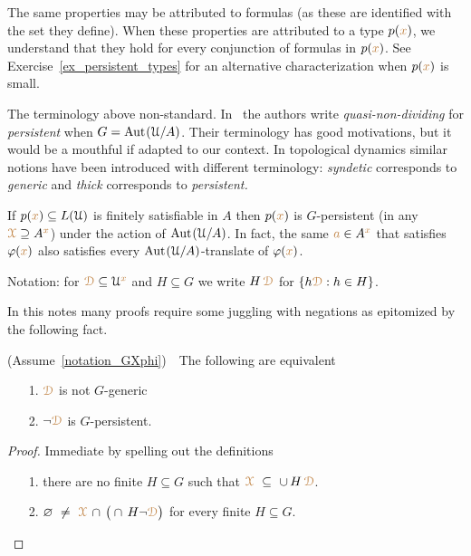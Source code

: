 The same properties may be attributed to formulas (as these are identified with the set they define).
When these properties are attributed to a type $p({\color{brown} x})$, we understand that they hold for every conjunction of formulas in $p({\color{brown} x})$.
See Exercise~\ref{ex_persistent_types} for an alternative characterization when $p({\color{brown} x})$ is small.

\noindent\llap{\textcolor{red}{\Large\warning}\kern1.5ex}\ignorespaces
The terminology above non-standard.
In~\cite{CK} the authors write \textit{quasi-non-dividing\/} for \textit{persistent\/} when $G={\rm Aut\kern.15ex}(\EuScript U/A)$.
Their terminology has good motivations, but it would be a mouthful if adapted to our context.
In topological dynamics similar notions have been introduced with different terminology: \textit{syndetic\/} corresponds to \textit{generic\/} and \textit{thick\/} corresponds to \textit{persistent.}

\begin{example}
  If $p({\color{brown} x})\subseteq L(\EuScript U)$ is finitely satisfiable in $A$ then $p({\color{brown} x})$ is $G$-persistent (in any ${\color{brown}\EuScript X}\supseteq A^{\color{brown} x}$) under the action of ${\rm Aut\kern.15ex}(\EuScript U/A)$.
  In fact, the same ${\color{brown} a}\in A^{\color{brown} x}$ that satisfies $\varphi({\color{brown} x})$ also satisfies every ${\rm Aut\kern.15ex}(\EuScript U/A)$-translate of $\varphi({\color{brown} x})$.
\end{example}

Notation: for ${\color{brown}\EuScript D}\subseteq\EuScript U^{\color{brown} x}$ and $H\subseteq G$ we write $H\,{\color{brown}\EuScript D}$ for $\{h{\color{brown}\EuScript D}: h\in H\}$.

In this notes many proofs require some juggling with negations as epitomized by the following fact.

\begin{fact}\label{fact_fip}
  (Assume~\ref{notation_GXphi})\ \  
  The following are equivalent
  \begin{itemize}
    \item[1.] ${\color{brown}\EuScript D}$ is not $G$-generic
    \item[2.] $\neg{\color{brown}\EuScript D}$ is $G$-persistent.
  \end{itemize}
\end{fact}

\begin{proof}
  Immediate by spelling out the definitions
  \begin{itemize}
    \item[1.] there are no finite $H\subseteq G$ such that ${\color{brown}\EuScript X}\ \subseteq\ \cup\, H\,{\color{brown}\EuScript D}$.
    \item[2.]  $\0\ \neq\ \mrX\,\cap\,\big(\cap\, H\neg{\mr\D}\big)$ for every finite $H\subseteq G$.\qedhere
  \end{itemize} 
\end{proof}

